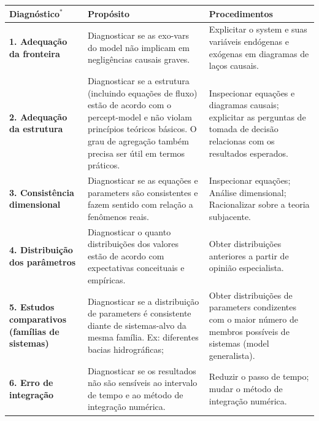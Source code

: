 \documentclass[./main.tex]{subfiles}
\begin{document}
{\renewcommand{\arraystretch}{1.5}%
\begin{table}[t!]
    \centering	
    \tiny
    \sffamily
    \begin{tabular}{ 
 >{\raggedright\arraybackslash}m{2.75cm}  
 >{\raggedright\arraybackslash}m{5cm}  
 >{\raggedright\arraybackslash}m{5cm}}
        \toprule
        \textbf{Diagnóstico}$^*$& \textbf{Propósito}& \textbf{Procedimentos}\\ 
        \midrule
        \textbf{1. Adequação da fronteira} & Diagnosticar se as \gls{exo-vars} do \gls{model} não implicam em negligências causais graves.& Explicitar o \gls{system} e suas variáveis endógenas e exógenas em diagramas de laços causais.\\         
        
        \textbf{2. Adequação da estrutura} & Diagnosticar se a estrutura (incluindo equações de fluxo) estão de acordo com o \gls{percept-model} e não violam princípios teóricos básicos. O grau de agregação também precisa ser útil em termos práticos.& 
        Inspecionar equações e diagramas causais; explicitar as perguntas de tomada de decisão relacionas com os resultados esperados.\\        
        
        \textbf{3. Consistência dimensional} & Diagnosticar se as equações e \gls{parameters} são consistentes e fazem sentido com relação a fenômenos reais.& 
        Inspecionar equações; Análise dimensional; Racionalizar sobre a \gls{teoria} subjacente.\\ 
        
        \textbf{4. Distribuição dos parâmetros} & Diagnosticar o quanto distribuições dos valores estão de acordo com expectativas conceituais e empíricas.& Obter distribuições anteriores a partir de opinião especialista.\\        
        
        \textbf{5. Estudos comparativos (famílias de sistemas)} & Diagnosticar se a distribuição de \gls{parameters} é consistente diante de sistemas-alvo da mesma família. Ex: diferentes bacias hidrográficas;& Obter distribuições de \gls{parameters} condizentes com o maior número de membros possíveis de sistemas (\gls{model} generalista).\\        
        
        \textbf{6. Erro de integração} & Diagnosticar se os resultados não são sensíveis ao intervalo de tempo e ao método de integração numérica.& Reduzir o passo de tempo; mudar o método de integração numérica.\\        
        

\end{tabular}
\end{table}}
\end{document}
